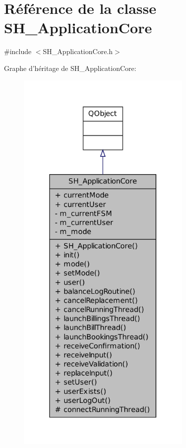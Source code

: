 \hypertarget{classSH__ApplicationCore}{\section{Référence de la classe S\-H\-\_\-\-Application\-Core}
\label{classSH__ApplicationCore}
}


{\ttfamily \#include $<$S\-H\-\_\-\-Application\-Core.\-h$>$}



Graphe d'héritage de S\-H\-\_\-\-Application\-Core\-:\nopagebreak
\begin{figure}[H]
\begin{center}
\leavevmode
\includegraphics[height=550pt]{classSH__ApplicationCore__inherit__graph}
\end{center}
\end{figure}


